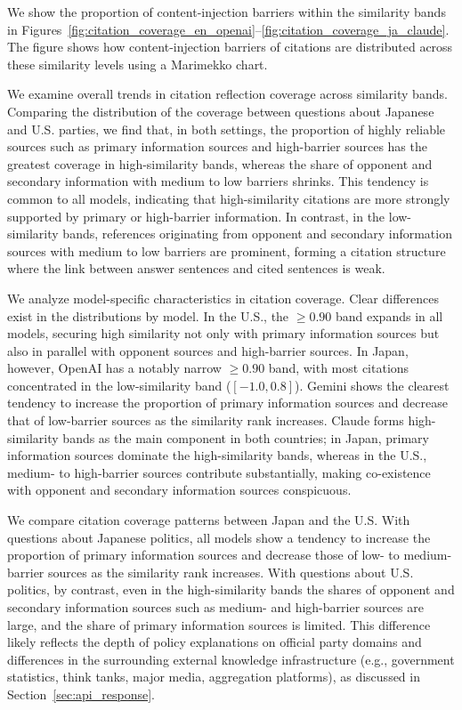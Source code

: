 We show the proportion of content-injection barriers within the similarity bands in Figures~\ref{fig:citation_coverage_en_openai}--\ref{fig:citation_coverage_ja_claude}.
The figure shows how content-injection barriers of citations are distributed across these similarity levels using a Marimekko chart.

We examine overall trends in citation reflection coverage across similarity bands.
Comparing the distribution of the coverage between questions about Japanese and U.S. parties, we find that, in both settings, the proportion of highly reliable sources such as primary information sources and high-barrier sources has the greatest coverage in high-similarity bands, whereas the share of opponent and secondary information with medium to low barriers shrinks.
This tendency is common to all models, indicating that high-similarity citations are more strongly supported by primary or high-barrier information.
In contrast, in the low-similarity bands, references originating from opponent and secondary information sources with medium to low barriers are prominent, forming a citation structure where the link between answer sentences and cited sentences is weak.

We analyze model-specific characteristics in citation coverage.
Clear differences exist in the distributions by model.
In the U.S., the \(\geq 0.90\) band expands in all models, securing high similarity not only with primary information sources but also in parallel with opponent sources and high-barrier sources.
In Japan, however, OpenAI has a notably narrow \(\geq 0.90\) band, with most citations concentrated in the low-similarity band (\([-1.0, 0.8]\)).
Gemini shows the clearest tendency to increase the proportion of primary information sources and decrease that of low-barrier sources as the similarity rank increases.
Claude forms high-similarity bands as the main component in both countries; in Japan, primary information sources dominate the high-similarity bands, whereas in the U.S., medium- to high-barrier sources contribute substantially, making co-existence with opponent and secondary information sources conspicuous.

We compare citation coverage patterns between Japan and the U.S.
With questions about Japanese politics, all models show a tendency to increase the proportion of primary information sources and decrease those of low- to medium-barrier sources as the similarity rank increases.
With questions about U.S. politics, by contrast, even in the high-similarity bands the shares of opponent and secondary information sources such as medium- and high-barrier sources are large, and the share of primary information sources is limited.
This difference likely reflects the depth of policy explanations on official party domains and differences in the surrounding external knowledge infrastructure (e.g., government statistics, think tanks, major media, aggregation platforms), as discussed in Section~\ref{sec:api_response}.

